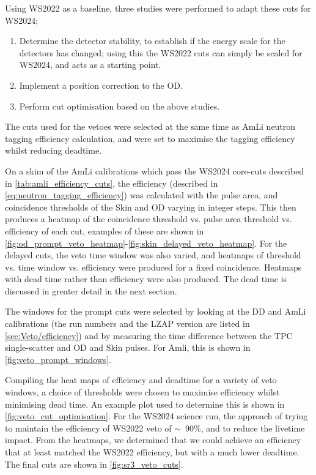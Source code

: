Using WS2022 as a baseline, three studies were performed to adapt these cuts for WS2024;
\begin{enumerate}
	\item Determine the detector stability, to establish if the energy scale for the detectors has changed; using this the WS2022 cuts can simply be scaled for WS2024, and acts as a starting point.
	\item Implement a position correction to the OD.
	\item Perform cut optimisation based on the above studies.
\end{enumerate}
The cuts used for the vetoes were selected at the same time as AmLi neutron tagging efficiency calculation, and were set to maximise the tagging efficiency whilst reducing deadtime.

On a skim of the AmLi calibrations which pass the WS2024 core-cuts described in \autoref{tab:amli_efficiency_cuts}, the efficiency (described in \autoref{eq:neutron_tagging_efficiency}) was calculated with the pulse area, and coincidence thresholds of the Skin and OD varying in integer steps.
This then produces a heatmap of the coincidence threshold vs. pulse area threshold vs. efficiency of each cut, examples of these are shown in \autoref{fig:od_prompt_veto_heatmap}-\ref{fig:skin_delayed_veto_heatmap}.
For the delayed cuts, the veto time window was also varied, and heatmaps of threshold vs. time window vs. efficiency were produced for a fixed coincidence. Heatmaps with dead time rather than efficiency were also produced. The dead time is discussed in greater detail in the next section.

The windows for the prompt cuts were selected by looking at the DD and AmLi calibrations (the run numbers and the LZAP version are listed in \autoref{sec:Veto/efficiency}) and by measuring the time difference between the TPC single-scatter and OD and Skin pulses.
For Amli, this is shown in \autoref{fig:veto_prompt_windows}.

Compiling the heat maps of efficiency and deadtime for a variety of veto windows, a choice of thresholds were chosen to maximise efficiency whilst minimising dead time.
An example plot used to determine this is shown in \autoref{fig:veto_cut_optimisation}.
For the WS2024 science run, the approach of trying to maintain the efficiency of WS2022 veto of $\sim$~90\%, and to reduce the livetime impact.
From the heatmaps, we determined that we could achieve an efficiency that at least matched the WS2022 efficiency, but with a much lower deadtime.
The final cuts are shown in \autoref{fig:sr3_veto_cuts}.

